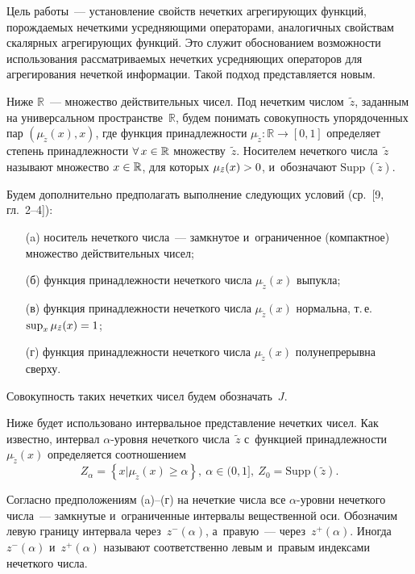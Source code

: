 \begin{multicols}{2}
Цель  работы~--- установление свойств нечетких агрегирующих функций, порождаемых 
нечеткими усредняющими операторами, аналогичных свойствам скалярных агрегирующих 
функций. Это служит обоснованием возможности использования рассматриваемых 
нечетких усредняющих операторов для агрегирования нечеткой информации. Такой 
подход представляется новым.


Ниже  $\mathbb{R}$~--- множество действительных чисел. Под нечетким чис\-лом~$\tilde{z}$, 
заданным на универсальном пространстве~$\mathbb{R}$, будем понимать совокупность 
упорядоченных пар $(\mu_{\tilde{z}}(x), x)$, где функция принадлежности 
$\mu_{\tilde{z}}: \mathbb{R}\rightarrow [0,1]$ определяет степень принадлежности $\forall 
\,x\hm\in \mathbb{R}$ множеству~$\tilde{z}$. Носителем нечеткого чис\-ла~$\tilde{z}$ называют 
множество $x\hm\in \mathbb{R}$, для которых $\mu_{\tilde{z}}(x) \hm> 0$, и~обозначают 
$\mathrm{Supp}\,(\tilde{z})$.

Будем дополнительно предполагать выполнение следующих условий (ср.~[9, гл.~2--4]):
\begin{itemize}
\item[(a)] носитель нечеткого чис\-ла~--- замкнутое и~ограниченное (компактное) множество 
действительных чисел;  
\item [(б)] функция принадлежности нечеткого чис\-ла 
$\mu_{\tilde{z}}(x)$ выпукла; 
\item[(в)] функция принадлежности нечеткого чис\-ла 
$\mu_{\tilde{z}}(x)$ нормальна, т.\,е.\ $\sup\nolimits_x\mu_{\tilde{z}}(x) \hm= 1$; 
\item [(г)] функция принадлежности нечеткого чис\-ла $\mu_{\tilde{z}}(x)$ полунепрерывна 
сверху.
\end{itemize}



Совокупность таких нечетких чисел будем обозначать~$J$.

Ниже будет использовано интервальное представление нечетких чисел. Как известно, 
интервал $\alpha$-уров\-ня нечеткого чис\-ла~$\tilde{z}$ с~функцией принадлежности 
$\mu_{\tilde{z}}(x)$ определяется соотношением
$$
Z_{\alpha}  = \left\{x | \mu_{\tilde{z}}(x)\geq \alpha\right\},\ \alpha\in(0, 1],\ Z_0 = \mathrm{Supp}\left(\tilde{z}\right).
$$

Согласно предположениям (a)--(г) на нечеткие чис\-ла все $\alpha$-уров\-ни нечеткого 
чис\-ла~--- замкнутые и~ограниченные интервалы вещественной оси. Обозначим левую  
границу интервала через~$z^{-}(\alpha)$, а~правую~--- через~$z^{+}(\alpha)$. Иногда 
$z^{-}(\alpha)$ и~$z^{+}(\alpha)$ называют соответственно левым и~правым 
индексами нечеткого числа.


\end{multicols}
